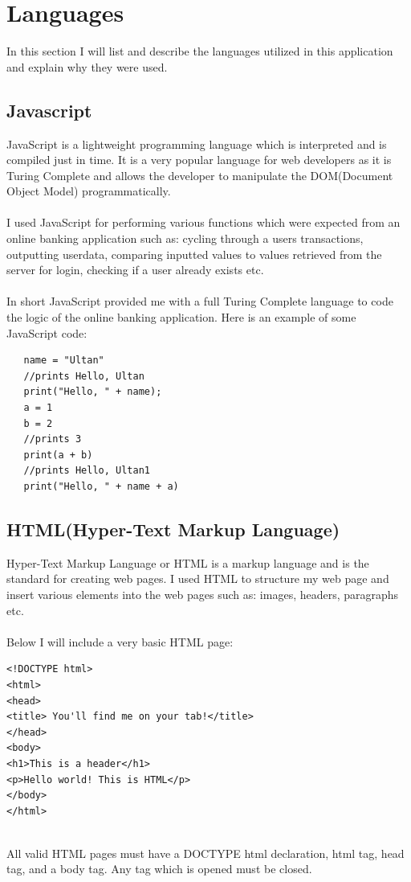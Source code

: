 \section{Languages}
In this section I will list and describe the languages utilized in this application and explain why they were used.
\subsection{Javascript}
JavaScript is a lightweight programming language which is interpreted and is compiled just in time\cite{JavaScript}.  It is a very popular language for web developers as it is Turing Complete and allows the developer to manipulate the DOM(Document Object Model) programmatically.
\\
\\
 I used JavaScript for performing various functions which were expected from an online banking application such as: cycling through a users transactions, outputting userdata, comparing inputted values to values retrieved from the server for login, checking if a user already exists etc.
 \\
 \\
 In short JavaScript provided me with a full Turing Complete language to code the logic of the online banking application. Here is an example of some JavaScript code:
 \begin{verbatim}
   name = "Ultan"
   //prints Hello, Ultan
   print("Hello, " + name);
   a = 1
   b = 2
   //prints 3
   print(a + b)
   //prints Hello, Ultan1
   print("Hello, " + name + a)

 \end{verbatim}
\subsection{HTML(Hyper-Text Markup Language)}
Hyper-Text Markup Language or HTML is a markup language and is the standard for creating web pages\cite{HTML}.  I used HTML to structure my web page and insert various elements into the web pages such as: images, headers, paragraphs etc.
\\
\\
Below I will include a very basic HTML page:
\begin{verbatim}
<!DOCTYPE html>
<html>
<head>
<title> You'll find me on your tab!</title>
</head>
<body>
<h1>This is a header</h1>
<p>Hello world! This is HTML</p>
</body>
</html>
\end{verbatim}
\\
All valid HTML pages must have a DOCTYPE html declaration, html tag, head tag, and a body tag.  Any tag which is opened must be closed.
